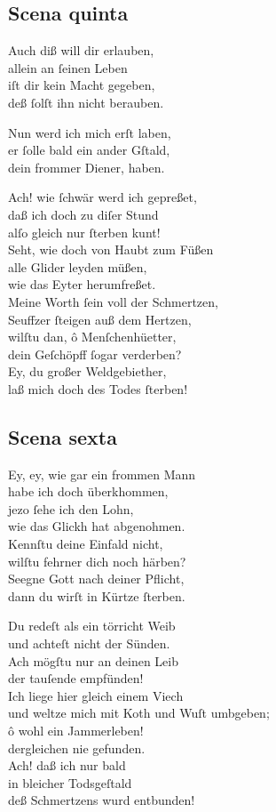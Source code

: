 \documentclass{ees}
\newenvironment{lyrics}[1]{%
  \subsection{#1}\nopagebreak%
  \begin{lyricslist}%
  \let\voice\item%
}{%
  \end{lyricslist}%
}
\begin{document}
\begin{lyrics}{Scena quinta}
  \voice[Schöpffer]
  Auch diß will dir erlauben,\\
  allein an ſeinen Leben\\
  iſt dir kein Macht gegeben,\\
  deß ſolſt ihn nicht berauben.

  \voice[Leviathan]
  Nun werd ich mich erſt laben,\\
  er ſolle bald ein ander Gſtald,\\
  dein frommer Diener, haben.

  \voice[Job]
  Ach! wie ſchwär werd ich gepreßet,\\
  daß ich doch zu diſer Stund\\
  alſo gleich nur ſterben kunt!\\
  Seht, wie doch von Haubt zum Füßen\\
  alle Glider leyden müßen,\\
  wie das Eyter herumfreßet.\\
  Meine Worth ſein voll der Schmertzen,\\
  Seuffzer ſteigen auß dem Hertzen,\\
  wilſtu dan, ô Menſchenhüetter,\\
  dein Geſchöpff ſogar verderben?\\
  Ey, du großer Weldgebiether,\\
  laß mich doch des Todes ſterben!
\end{lyrics}
\clearpage
\begin{lyrics}{Scena sexta}
  \voice[Jobs Frau]
  Ey, ey, wie gar ein frommen Mann\\
  habe ich doch überkhommen,\\
  jezo ſehe ich den Lohn,\\
  wie das Glickh hat abgenohmen.\\
  Kennſtu deine Einfald nicht,\\
  wilſtu fehrner dich noch härben?\\
  Seegne Gott nach deiner Pflicht,\\
  dann du wirſt in Kürtze ſterben.

  \voice[Job]
  Du redeſt als ein törricht Weib\\
  und achteſt nicht der Sünden.\\
  Ach mögſtu nur an deinen Leib\\
  der tauſende empfünden!\\
  Ich liege hier gleich einem Viech\\
  und weltze mich mit Koth und Wuſt umbgeben;\\
  ô wohl ein Jammerleben!\\
  dergleichen nie gefunden.\\
  Ach! daß ich nur bald\\
  in bleicher Todsgeſtald\\
  deß Schmertzens wurd entbunden!
\end{lyrics}
\end{document}
